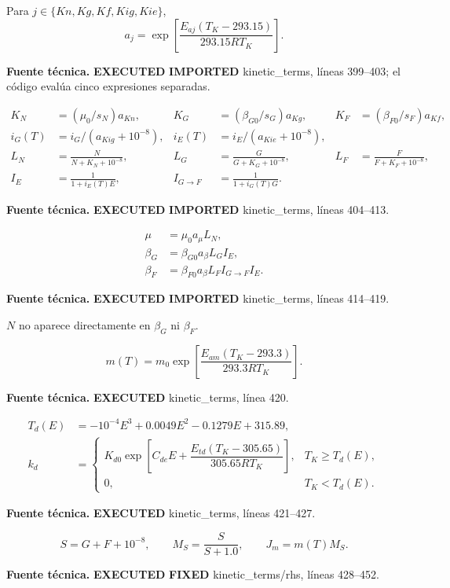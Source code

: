 \documentclass[11pt]{article}
\newcommand{\E}[1]{%
  \nobreak\hspace{0.16em}%
  \begingroup
  \setlength{\fboxsep}{1.5pt}%
  \colorbox{auditpale}{\textcolor{auditblue}{\sffamily\bfseries\scriptsize #1}}%
  \endgroup\hspace{0.16em}%
}
\newcommand{\code}[1]{{\small\ttfamily #1}}
\newcommand{\sourceinfo}[1]{%
  \par\vspace{-0.15em}%
  {\small\color{auditslate}\sffamily\textbf{Fuente técnica.}\enspace #1\par}%
  \vspace{0.25em}%
}
\begin{document}
Para $j\in\{Kn,Kg,Kf,Kig,Kie\}$,
\begin{equation}
a_j=\exp\!\left[\frac{E_{aj}(T_K-293.15)}{293.15RT_K}\right]. \tag{R04--R08}
\end{equation}
\sourceinfo{\E{EXECUTED}\E{IMPORTED} \code{kinetic\_terms}, líneas 399--403;
el código evalúa cinco expresiones separadas.}

\begin{align}
K_N&=(\mu_0/s_N)a_{Kn}, &K_G&=(\beta_{G0}/s_G)a_{Kg},
&K_F&=(\beta_{F0}/s_F)a_{Kf}, \tag{R09--R11}\\
i_G(T)&=i_G/(a_{Kig}+10^{-8}), &i_E(T)&=i_E/(a_{Kie}+10^{-8}), \tag{R12--R13}\\
L_N&=\frac{N}{N+K_N+10^{-8}}, &L_G&=\frac{G}{G+K_G+10^{-8}},
&L_F&=\frac{F}{F+K_F+10^{-8}}, \tag{R14--R16}\\
I_E&=\frac{1}{1+i_E(T)E}, &I_{G\to F}&=\frac{1}{1+i_G(T)G}. \tag{R17--R18}
\end{align}
\sourceinfo{\E{EXECUTED}\E{IMPORTED} \code{kinetic\_terms}, líneas 404--413.}

\begin{align}
\mu&=\mu_0a_\mu L_N, \tag{R19}\\
\beta_G&=\beta_{G0}a_\beta L_GI_E, \tag{R20}\\
\beta_F&=\beta_{F0}a_\beta L_FI_{G\to F}I_E. \tag{R21}
\end{align}
\sourceinfo{\E{EXECUTED}\E{IMPORTED} \code{kinetic\_terms}, líneas 414--419.}
$N$ no aparece directamente en $\beta_G$ ni $\beta_F$.

\begin{equation}
m(T)=m_0\exp\!\left[\frac{E_{am}(T_K-293.3)}{293.3RT_K}\right]. \tag{R22}
\end{equation}
\sourceinfo{\E{EXECUTED} \code{kinetic\_terms}, línea 420.}

\begin{align}
T_d(E)&=-10^{-4}E^3+0.0049E^2-0.1279E+315.89, \tag{R23}\\
k_d&=\begin{cases}
K_{d0}\exp\!\left[C_{de}E+\dfrac{E_{td}(T_K-305.65)}{305.65RT_K}\right],&T_K\ge T_d(E),\\
0,&T_K<T_d(E).
\end{cases} \tag{R24}
\end{align}
\sourceinfo{\E{EXECUTED} \code{kinetic\_terms}, líneas 421--427.}

\begin{equation}
S=G+F+10^{-8},\qquad M_S=\frac{S}{S+1.0},\qquad J_m=m(T)M_S. \tag{R25}
\end{equation}
\sourceinfo{\E{EXECUTED}\E{FIXED} \code{kinetic\_terms}/\code{rhs}, líneas 428--452.}
\end{document}
